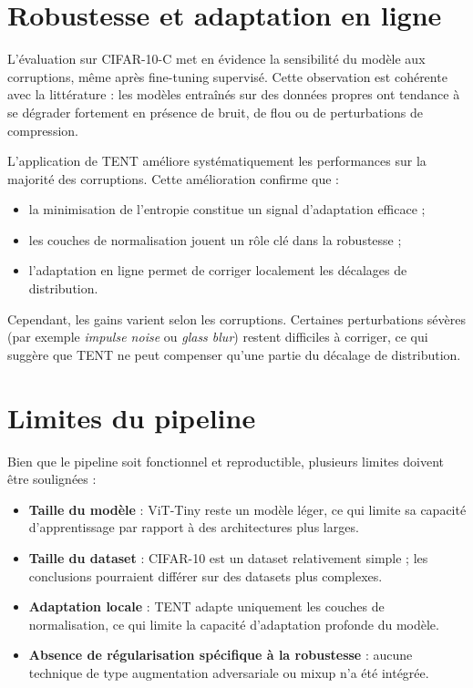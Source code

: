 \documentclass[12pt,a4paper]{report}
\begin{document}
	\section*{Robustesse et adaptation en ligne}
	
	L’évaluation sur CIFAR-10-C met en évidence la sensibilité du modèle aux corruptions, même après fine-tuning supervisé. Cette observation est cohérente avec la littérature : les modèles entraînés sur des données propres ont tendance à se dégrader fortement en présence de bruit, de flou ou de perturbations de compression.
	
	L’application de TENT améliore systématiquement les performances sur la majorité des corruptions. Cette amélioration confirme que :
	\begin{itemize}
		\item la minimisation de l’entropie constitue un signal d’adaptation efficace ;
		\item les couches de normalisation jouent un rôle clé dans la robustesse ;
		\item l’adaptation en ligne permet de corriger localement les décalages de distribution.
	\end{itemize}
	
	Cependant, les gains varient selon les corruptions. Certaines perturbations sévères (par exemple \textit{impulse noise} ou \textit{glass blur}) restent difficiles à corriger, ce qui suggère que TENT ne peut compenser qu’une partie du décalage de distribution.
	
	\section*{Limites du pipeline}
	
	Bien que le pipeline soit fonctionnel et reproductible, plusieurs limites doivent être soulignées :
	
	\begin{itemize}
		\item \textbf{Taille du modèle} : ViT-Tiny reste un modèle léger, ce qui limite sa capacité d’apprentissage par rapport à des architectures plus larges.
		\item \textbf{Taille du dataset} : CIFAR-10 est un dataset relativement simple ; les conclusions pourraient différer sur des datasets plus complexes.
		\item \textbf{Adaptation locale} : TENT adapte uniquement les couches de normalisation, ce qui limite la capacité d’adaptation profonde du modèle.
		\item \textbf{Absence de régularisation spécifique à la robustesse} : aucune technique de type augmentation adversariale ou mixup n’a été intégrée.
	\end{itemize}
	
\end{document}
